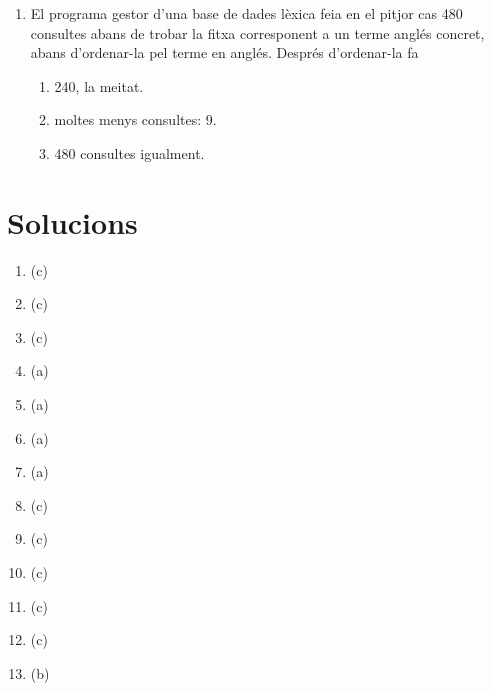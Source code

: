 \begin{enumerate}
\item 
El programa gestor d'una base de dades lèxica feia en el pitjor cas 480 consultes abans de trobar la fitxa corresponent a un terme anglés concret, abans d'ordenar-la pel terme en anglés. Després d'ordenar-la fa
\begin{enumerate}
\item 240, la meitat.
\item moltes menys consultes: 9.
\item 480 consultes igualment.
\end{enumerate}


\end{enumerate}

\section{Solucions}
\begin{enumerate}
\item (c)
\item (c)
\item (c)
\item (a)
\item (a)
\item (a)
\item (a)
\item (c)
\item (c)
\item (c)
\item (c)
\item (c)
\item (b) 


\end{enumerate}
